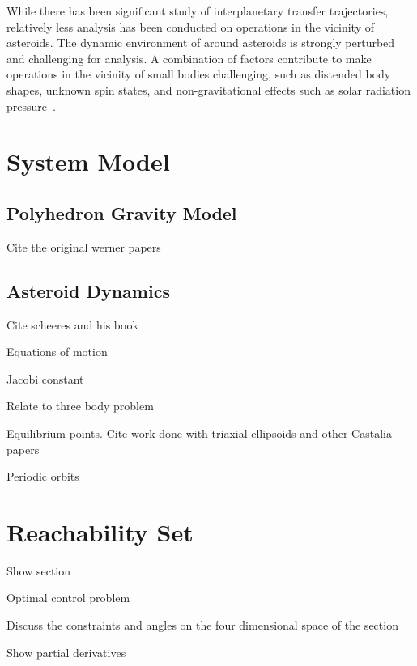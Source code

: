 \documentclass[]{aiaa-tc}%
\begin{document}
While there has been significant study of interplanetary transfer trajectories, relatively less analysis has been conducted on operations in the vicinity of asteroids.
The dynamic environment of around asteroids is strongly perturbed and challenging for analysis.
A combination of factors contribute to make operations in the vicinity of small bodies challenging, such as distended body shapes, unknown spin states, and non-gravitational effects such as solar radiation pressure~\cite{scheeres2012}.


 

	
\section{System Model}

\subsection{Polyhedron Gravity Model}

Cite the original werner papers

\subsection{Asteroid Dynamics}
Cite scheeres and his book

Equations of motion

Jacobi constant

Relate to three body problem

Equilibrium points. Cite work done with triaxial ellipsoids and other Castalia papers

Periodic orbits

\section{Reachability Set}

Show \Poincare section

Optimal control problem 

Discuss the constraints and angles on the four dimensional space of the section

Show partial derivatives 
\end{document}
